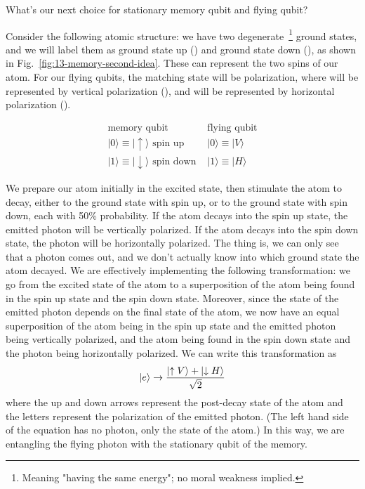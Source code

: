 What's our next choice for stationary memory qubit and flying qubit?

Consider the following atomic structure: we have two degenerate~\footnote{Meaning "having the same energy"; no moral weakness implied.} ground states, and we will label them as ground state up (\ket{\uparrow}) and ground state down (\ket{\downarrow}), as shown in Fig.~\ref{fig:13-memory-second-idea}. These can represent the two spins of our atom.
For our flying qubits, the matching state will be polarization, where  will be represented by vertical polarization (), and  will be represented by horizontal polarization (). 

\begin{equation}
\begin{array}{ll}
\text{memory qubit} & \text{flying qubit} \\
|0\rangle \equiv|\uparrow\rangle \text { spin up } & |0\rangle \equiv|V\rangle \\
|1\rangle \equiv|\downarrow\rangle \text { spin down } & |1\rangle \equiv|H\rangle
\end{array}
\end{equation}

We prepare our atom initially in the excited state, then stimulate the atom to decay, either to the ground state with spin up, or to the ground state with spin down, each with 50\% probability.  If the atom decays into the spin up state, the emitted photon will be vertically polarized.  If the atom decays into the spin down state, the photon will be horizontally polarized.  The thing is, we can only see that a photon comes out, and we don't actually know into which ground state the atom decayed. We are effectively implementing the following transformation: we go from the excited state of the atom to a superposition of the atom being found in the spin up state and the spin down state. 
Moreover, since the state of the emitted photon depends on the final state of the atom, we now have an equal superposition of the atom being in the spin up state and the emitted photon being vertically polarized, and the atom being found in the spin down state and the photon being horizontally polarized. We can write this transformation as
\begin{equation}
\left| e \right\rangle \rightarrow \frac{\left| \uparrow V \right\rangle+\left| \downarrow H \right\rangle}{\sqrt{2}}
\end{equation}
where the up and down arrows represent the post-decay state of the atom and the letters represent the polarization of the emitted photon.  (The left hand side of the equation has no photon, only the state of the atom.) In this way, we are entangling the flying photon with the stationary qubit of the memory.

